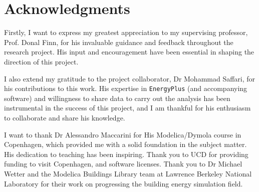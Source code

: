 


\bigskip

\begingroup
\let\clearpage\relax
\let\cleardoublepage\relax
\let\cleardoublepage\relax
\chapter*{Acknowledgments}
Firstly, I want to express my greatest appreciation to my supervising professor, Prof. Donal Finn, for his invaluable guidance and feedback throughout the research project. His input and encouragement have been essential in shaping the direction of this project.

I also extend my gratitude to the project collaborator, Dr Mohammad Saffari, for his contributions to this work. His expertise in \texttt{EnergyPlus} (and accompanying software) and willingness to share data to carry out the analysis has been instrumental in the success of this project, and I am thankful for his enthusiasm to collaborate and share his knowledge.

I want to thank Dr Alessandro Maccarini for His Modelica/Dymola course in Copenhagen, which provided me with a solid foundation in the subject matter. His dedication to teaching has been inspiring. Thank you to UCD for providing funding to visit Copenhagen, and software licenses. Thank you to Dr Michael Wetter and the Modelica Buildings Library team at Lawrence Berkeley National Laboratory for their work on progressing the building energy simulation field. 

